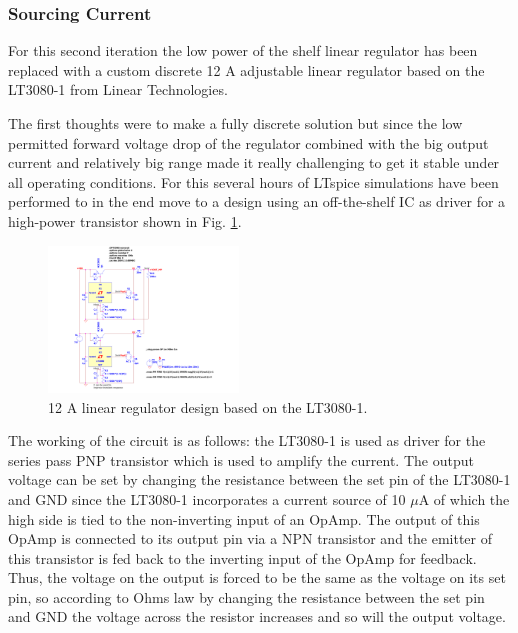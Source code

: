 \subsubsection{Sourcing Current}
For this second iteration the low power of the shelf linear regulator has been replaced with a custom discrete 12 A adjustable linear regulator based on the LT3080-1 from Linear Technologies.

The first thoughts were to make a fully discrete solution but since the low permitted forward voltage drop of the regulator combined with the big output current and relatively big range made it really challenging to get it stable
under all operating conditions. For this several hours of LTspice simulations have been performed to in the end move to a design using an off-the-shelf IC as driver for a high-power transistor shown in Fig. \ref{fig:LT3080-1_LinRegSchematic}.

\begin{figure}[h!]
    \centering
    \includegraphics[width=0.45\textwidth]{LT3080-1_LinRegSchematic.pdf}
    \caption{12 A linear regulator design based on the LT3080-1.}
    \label{fig:LT3080-1_LinRegSchematic}
\end{figure}

The working of the circuit is as follows: the LT3080-1 is used as driver for the series pass PNP transistor which is used to amplify the current.
The output voltage can be set by changing the resistance between the set pin of the LT3080-1 and GND since the LT3080-1 incorporates a current source of 10 $\mu$A of which the high side is tied to the non-inverting input of an OpAmp. The output of this OpAmp is connected to its output pin via a NPN transistor and the emitter of this transistor is fed back to the inverting input of the OpAmp for feedback. Thus, the voltage on the output is forced to be the same as the voltage on its set pin, so according to Ohms law by changing the resistance between the set pin and GND the voltage across the resistor increases and so will the output voltage.

